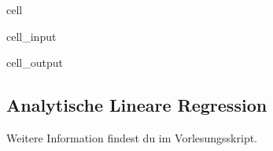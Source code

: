 \documentclass[letterpaper,10pt,english]{jupyterBook}
\begin{document}
\begin{sphinxuseclass}{cell}
\begin{sphinxVerbatimInput}
\begin{sphinxuseclass}{cell_input}
\end{sphinxuseclass}\end{sphinxVerbatimInput}
\begin{sphinxVerbatimOutput}

\begin{sphinxuseclass}{cell_output}
\noindent{}

\end{sphinxuseclass}\end{sphinxVerbatimOutput}

\end{sphinxuseclass}

\subsection{Analytische Lineare Regression}
\label{\detokenize{content/T_LinReg:analytische-lineare-regression}}
\sphinxAtStartPar
Weitere Information findest du {\hyperref[\detokenize{content/1_Kurvenanpassung::doc}]{}} im Vorlesungsskript.
\end{document}

